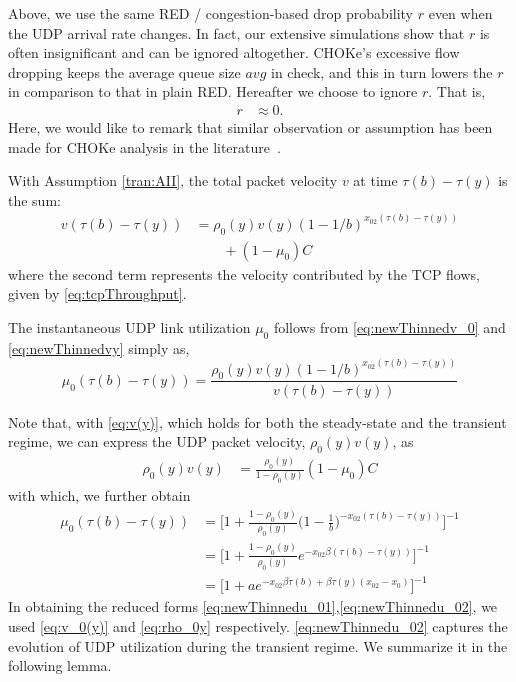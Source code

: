 \documentclass{IEEEtran}
\begin{document}
Above, we use the same RED / congestion-based drop probability $r$ even when the UDP arrival rate changes. In fact, our extensive simulations show that  $r$ is often insignificant and can be ignored altogether. CHOKe's excessive flow dropping keeps the average queue size $\mathit{avg}$ in check, and this in turn lowers the $r$ in comparison to that in plain RED. Hereafter we choose to ignore $r$. That is,
     \begin{align}\label{eq:neglectRED}
        r &\approx 0.
    \end{align}
Here, we would like to remark that similar observation or assumption has been made for CHOKe analysis in the literature~\cite{ChokeSigmetrics03}.

    With Assumption \ref{tran:AII}, the total packet velocity $v$ at time $\tau(b)-\tau(y)$ is the sum:
    \begin{align} \label{eq:newThinnedvy}
                v(\tau(b)-\tau(y))&=\rho_0(y)v(y)(1-1/b)^{x_{02}(\tau(b)-\tau(y))} \nonumber \\
                                        & \qquad +(1-\mu_0)C
    \end{align}
where the second term represents the velocity contributed by the TCP flows, given by \eqref{eq:tcpThroughput}.

The instantaneous UDP link utilization $\mu_0$ follows from \eqref{eq:newThinnedv_0} and \eqref{eq:newThinnedvy} simply as,
    \begin{equation}
        \mu_0(\tau(b)-\tau(y)) = \frac{\rho_0(y)v(y)(1-1/b)^{x_{02}(\tau(b)-\tau(y))}}{v(\tau(b)-\tau(y))}
    \end{equation}

Note that, with \eqref{eq:v(y)}, which holds for both the steady-state and the transient regime, we can express the UDP packet velocity, $\rho_0(y)v(y)$,  as
    \begin{align}
            \rho_0(y)v(y)&= \frac{\rho_0(y)}{1-\rho_0(y)}(1-\mu_0) C    \label{eq:v_0(y)}
    \end{align}
with which, we further obtain
\begin{subequations}
    \begin{align}
\mu_0(\tau(b)-\tau(y)) &= \bigg[1+\frac{1-\rho_0(y)}{\rho_0(y)}\bigg(1-\frac{1}{b}\bigg)^{-x_{02}(\tau(b)-\tau(y))}\bigg]^{-1}  \nonumber \\
                                   &= \bigg[1+\frac{1-\rho_0(y)}{\rho_0(y)}e^{-x_{02}\beta(\tau(b)-\tau(y))}\bigg]^{-1} \label{eq:newThinnedu_01}\\
                                   &= \bigg[1+a e^{-x_{02}\beta\tau(b)+\beta \tau(y)(x_{02}-x_0)}\bigg]^{-1}    \label{eq:newThinnedu_02}
    \end{align}
    \end{subequations}
    In obtaining the reduced forms \eqref{eq:newThinnedu_01},\eqref{eq:newThinnedu_02}, we used \eqref{eq:v_0(y)} and \eqref{eq:rho_0y} respectively. 
 \eqref{eq:newThinnedu_02} captures the evolution of UDP utilization during the transient regime. We summarize it in the following lemma.
\end{document}
